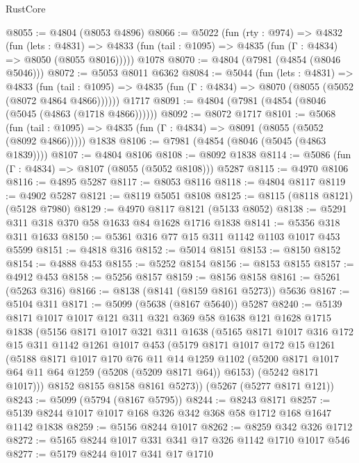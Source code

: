 \begin{lexlean}{RustCore}
\begin{coremodule}
@8055 := @4804 (@8053 @4896)
@8066 := @5022
    (fun (rty : @974) =>
    @4832
      (fun (lets : @4831) =>
      @4833 (fun (tail : @1095) => @4835 (fun (Γ : @4834) => @8050 (@8055 @8016)))))
    @1078
@8070 := @4804 (@7981 (@4854 (@8046 @5046)))
@8072 := @5053 @8011 @6362
@8084 := @5044
    (fun (lets : @4831) =>
    @4833
      (fun (tail : @1095) => @4835 (fun (Γ : @4834) => @8070 (@8055 (@5052 (@8072 @4864 @4866))))))
    @1717
@8091 := @4804 (@7981 (@4854 (@8046 (@5045 (@4863 (@1718 @4866))))))
@8092 := @8072 @1717
@8101 := @5068
    (fun (tail : @1095) => @4835 (fun (Γ : @4834) => @8091 (@8055 (@5052 (@8092 @4866)))))
    @1838
@8106 := @7981 (@4854 (@8046 (@5045 (@4863 @1839))))
@8107 := @4804 @8106
@8108 := @8092 @1838
@8114 := @5086 (fun (Γ : @4834) => @8107 (@8055 (@5052 @8108))) @5287
@8115 := @4970 @8106
@8116 := @4895 @5287
@8117 := @8053 @8116
@8118 := @4804 @8117
@8119 := @4902 @5287
@8121 := @8119 @5051 @8108
@8125 := @8115 (@8118 @8121) (@5128 @7980)
@8129 := @4970 @8117 @8121 (@5133 @8052)
@8138 := @5291 @311 @318 @370 @58 @1633 @84 @1628 @1716 @1838
@8141 := @5356 @318 @311 @1633
@8150 := @5361 @316 @77 @15 @311 @1142 @1103 @1017 @453 @5599
@8151 := @4818 @316
@8152 := @5014 @8151
@8153 := @8150 @8152
@8154 := @4888 @453
@8155 := @5252 @8154
@8156 := @8153 @8155
@8157 := @4912 @453
@8158 := @5256 @8157
@8159 := @8156 @8158
@8161 := @5261 (@5263 @316)
@8166 := @8138 (@8141 (@8159 @8161 @5273)) @5636
@8167 := @5104 @311
@8171 := @5099 (@5638 (@8167 @5640)) @5287
@8240 := @5139
    @8171
    @1017
    @1017
    @121
    @311
    @321
    @369
    @58
    @1638
    @121
    @1628
    @1715
    @1838
    (@5156
      @8171
      @1017
      @321
      @311
      @1638
      (@5165
        @8171
        @1017
        @316
        @172
        @15
        @311
        @1142
        @1261
        @1017
        @453
        (@5179
          @8171
          @1017
          @172
          @15
          @1261
          (@5188
            @8171
            @1017
            @170
            @76
            @11
            @14
            @1259
            @1102
            (@5200 @8171 @1017 @64 @11 @64 @1259 (@5208 (@5209 @8171 @64)) @6153)
            (@5242 @8171 @1017)))
        @8152
        @8155
        @8158
        @8161
        @5273))
    (@5267 (@5277 @8171 @121))
@8243 := @5099 (@5794 (@8167 @5795))
@8244 := @8243 @8171
@8257 := @5139 @8244 @1017 @1017 @168 @326 @342 @368 @58 @1712 @168 @1647 @1142 @1838
@8259 := @5156 @8244 @1017
@8262 := @8259 @342 @326 @1712
@8272 := @5165 @8244 @1017 @331 @341 @17 @326 @1142 @1710 @1017 @546
@8277 := @5179 @8244 @1017 @341 @17 @1710

\end{coremodule}
\end{lexlean}
